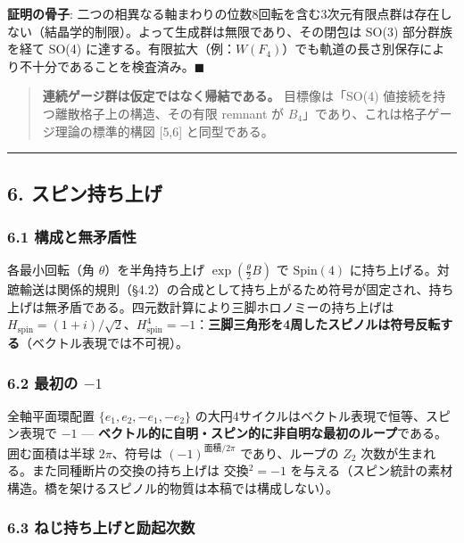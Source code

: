 \documentclass[
]{ltjsarticle}
\begin{document}
\textbf{証明の骨子}:
二つの相異なる軸まわりの位数8回転を含む3次元有限点群は存在しない（結晶学的制限）。よって生成群は無限であり、その閉包は
SO(3) 部分群族を経て SO(4)
に達する。有限拡大（例：\(W(F_4)\)）でも軌道の長さ別保存により不十分であることを検査済み。\(\blacksquare\)

\begin{quote}
\textbf{連続ゲージ群は仮定ではなく帰結である。} 目標像は「SO(4)
値接続を持つ離散格子上の構造、その有限 remnant が
\(B_4\)」であり、これは格子ゲージ理論の標準的構図 {[}5,6{]}
と同型である。
\end{quote}

\begin{center}\rule{0.5\linewidth}{0.5pt}\end{center}

\subsection{6.
スピン持ち上げ}\label{ux30b9ux30d4ux30f3ux6301ux3061ux4e0aux3052}

\subsubsection{6.1
構成と無矛盾性}\label{ux69cbux6210ux3068ux7121ux77dbux76feux6027}

各最小回転（角 \(\theta\)）を半角持ち上げ \(\exp(\tfrac\theta2 B)\) で
\(\mathrm{Spin}(4)\)
に持ち上げる。対蹠輸送は関係的規則（§4.2）の合成として持ち上がるため符号が固定され、持ち上げは無矛盾である。四元数計算により三脚ホロノミーの持ち上げは
\(H_{\mathrm{spin}}=(1+i)/\sqrt2\)、\(H_{\mathrm{spin}}^4=-1\)：\textbf{三脚三角形を4周したスピノルは符号反転する}（ベクトル表現では不可視）。

\subsubsection{\texorpdfstring{6.2 最初の
\(-1\)}{6.2 最初の -1}}\label{ux6700ux521dux306e--1}

全軸平面環配置 \(\{e_1,e_2,-e_1,-e_2\}\)
の大円4サイクルはベクトル表現で恒等、スピン表現で \(-1\) ---
\textbf{ベクトル的に自明・スピン的に非自明な最初のループ}である。囲む面積は半球
\(2\pi\)、符号は \((-1)^{\text{面積}/2\pi}\) であり、ループの \(Z_2\)
次数が生まれる。また同種断片の交換の持ち上げは 交換\(^2=-1\)
を与える（スピン統計の素材構造。橋を架けるスピノル的物質は本稿では構成しない）。

\subsubsection{6.3
ねじ持ち上げと励起次数}\label{ux306dux3058ux6301ux3061ux4e0aux3052ux3068ux52b1ux8d77ux6b21ux6570}
\end{document}
